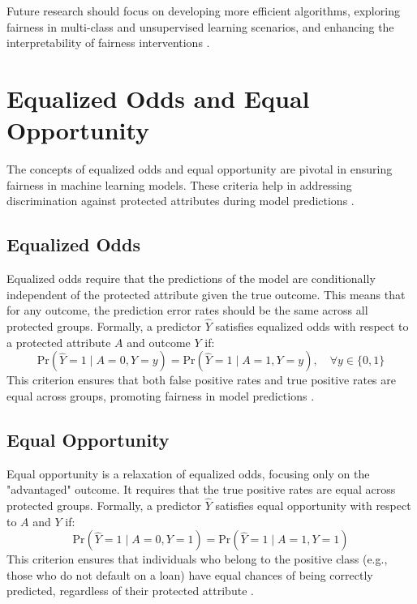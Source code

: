 \documentclass[12pt,a4paper]{report}
\begin{document}
Future research should focus on developing more efficient algorithms, exploring fairness in multi-class and unsupervised learning scenarios, and enhancing the interpretability of fairness interventions \citep{caton2024fairness}.\\





\section{Equalized Odds and Equal Opportunity}
The concepts of equalized odds and equal opportunity are pivotal in ensuring fairness in machine learning models. These criteria help in addressing discrimination against protected attributes during model predictions \citep{hardt2016equality}.\\

\subsection{Equalized Odds}
Equalized odds require that the predictions of the model are conditionally independent of the protected attribute given the true outcome. This means that for any outcome, the prediction error rates should be the same across all protected groups. Formally, a predictor \( \hat{Y} \) satisfies equalized odds with respect to a protected attribute \( A \) and outcome \( Y \) if:
\[
\text{Pr}(\hat{Y} = 1 \mid A = 0, Y = y) = \text{Pr}(\hat{Y} = 1 \mid A = 1, Y = y), \quad \forall y \in \{0, 1\}
\]
This criterion ensures that both false positive rates and true positive rates are equal across groups, promoting fairness in model predictions \citep{hardt2016equality}.\\

\subsection{Equal Opportunity}
Equal opportunity is a relaxation of equalized odds, focusing only on the "advantaged" outcome. It requires that the true positive rates are equal across protected groups. Formally, a predictor \( \hat{Y} \) satisfies equal opportunity with respect to \( A \) and \( Y \) if:
\[
\text{Pr}(\hat{Y} = 1 \mid A = 0, Y = 1) = \text{Pr}(\hat{Y} = 1 \mid A = 1, Y = 1)
\]
This criterion ensures that individuals who belong to the positive class (e.g., those who do not default on a loan) have equal chances of being correctly predicted, regardless of their protected attribute \citep{hardt2016equality}.\\
\end{document}
